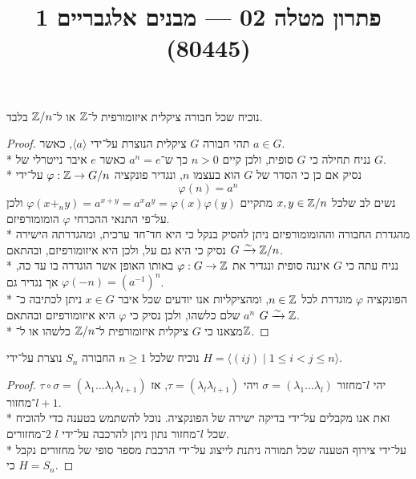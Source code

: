 
\title{פתרון מטלה 02 --- מבנים אלגבריים 1 (80445)}


\maketitle
\maketitleprint{}

\Question{}
נוכיח שכל חבורה ציקלית איזומורפית ל־$\mathbb{Z}$ או ל־$\mathbb{Z}/n$ בלבד.
\begin{proof}
	תהי חבורה $G$ ציקלית הנוצרת על־ידי $\langle a \rangle$, כאשר $a \in G$. \\*
	נניח תחילה כי $G$ סופית, ולכן קיים $n > 0$ כך ש־$a^n = e$ כאשר $e$ איבר נייטרלי של $G$. \\*
	נסיק אם כן כי הסדר של $G$ הוא בעצמו $n$, ונגדיר פונקציה $\varphi : \mathbb{Z} \to G/n$ על־ידי
	\[
		\varphi(n) = a^n
	\]
	נשים לב שלכל $x, y \in \mathbb{Z}/n$ מתקיים $\varphi(x +_n y) = a^{x + y} = a^x a^y = \varphi(x) \varphi(y)$ ולכן על־פי התנאי ההכרחי $\varphi$ הומומורפיזם. \\*
	מהגדרת החבורה וההומומורפיזם ניתן להסיק בנקל כי היא חד־חד ערכית, ומהגדרתה הישירה נסיק כי היא גם על, ולכן היא איזומורפיזם, ובהתאם $G \xrightarrow{\sim} \mathbb{Z}/n$. \\*
	נניח עתה כי $G$ איננה סופית ונגדיר את $\varphi : G \to \mathbb{Z}$ באותו האופן אשר הוגדרה בו עד כה, אך נגדיר גם $\varphi(-n) = {(a^{-1})}^n$. \\*
	הפונקציה $\varphi$ מוגדרת לכל $n \in \mathbb{Z}$, ומהציקליות אנו יודעים שכל איבר $x \in G$ ניתן לכתיבה כ־$a^n$ שלם כלשהו, ולכן נסיק כי $\varphi$ היא איזומורפיזם ובהתאם $G \xrightarrow{\sim} \mathbb{Z}$. \\*
	מצאנו כי $G$ ציקלית איזומורפית ל־$\mathbb{Z}/n$ כלשהו או ל־$\mathbb{Z}$.
\end{proof}

\Question{}
\Subquestion{}
נוכיח שלכל $n \ge 1$ החבורה $S_n$ נוצרת על־ידי $H = \langle (i j) \mid 1 \le i < j \le n \rangle$.
\begin{proof}
	יהי $l$־מחזור $\sigma = (\lambda_1 \hdots \lambda_l)$ ויהי $\tau = (\lambda_l \lambda_{l + 1})$, אז $\tau \circ \sigma = (\lambda_1 \hdots \lambda_l \lambda_{l + 1})$ $l + 1$־מחזור. \\*
	זאת אנו מקבלים על־ידי בדיקה ישירה של הפונקציה. נוכל להשתמש בטענה כדי להוכיח שכל $l$־מחזור נתון ניתן להרכבה על־ידי $l$ $2$־מחזורים. \\*
	על־ידי צירוף הטענה שכל תמורה ניתנת לייצוג על־ידי הרכבת מספר סופי של מחזורים נקבל כי $H = S_n$.
\end{proof}

